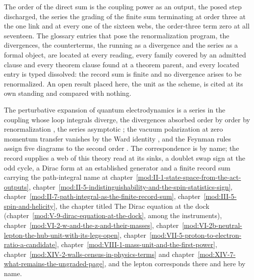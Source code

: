 The order of the direct sum is the coupling power as an output, the posed step discharged, the series the grading of the finite sum terminating at order three at the one link and at every one of the sixteen webs, the order-three term zero at all seventeen.
The glossary entries that pose the renormalization program, the divergences, the counterterms, the running as a divergence and the series as a formal object, are located at every reading, every family covered by an admitted clause and every theorem clause found at a theorem parent, and every located entry is typed dissolved: the record sum is finite and no divergence arises to be renormalized. An open result placed here, the unit as the scheme, is cited at its own standing and compared with nothing.
\begin{chbridge}
The perturbative expansion of quantum electrodynamics is a series in the coupling whose loop integrals diverge, the divergences absorbed order by order by renormalization \cite{Dyson1949}, the series asymptotic \cite{Dyson1952}; the vacuum polarization at zero momentum transfer vanishes by the Ward identity \cite{Peskin1995}, and the Feynman rules assign five diagrams to the second order \cite{Feynman1949}. The correspondence is by name; the record supplies a web of this theory read at its sinks, a doublet swap sign at the odd cycle, a Dirac form at an established generator and a finite record sum carrying the path-integral name at chapter~\ref{mod:II-1-state-space-from-the-act-outputs}, chapter~\ref{mod:II-5-indistinguishability-and-the-spin-statistics-sign}, chapter~\ref{mod:II-7-path-integral-as-the-finite-record-sum}, chapter~\ref{mod:III-5-spin-and-helicity}, the chapter titled The Dirac equation at the dock (chapter~\ref{mod:V-9-dirac-equation-at-the-dock}, among the instruments), chapter~\ref{mod:VI-2-w-and-the-z-and-their-masses}, chapter~\ref{mod:VI-2b-neutral-lepton-the-hub-unit-with-its-legs-open}, chapter~\ref{mod:VII-5-proton-to-electron-ratio-a-candidate}, chapter~\ref{mod:VIII-1-mass-unit-and-the-first-power}, chapter~\ref{mod:XIV-2-walls-census-in-physics-terms} and chapter~\ref{mod:XIV-7-what-remains-the-ungraded-page}, and the lepton corresponds there and here by name.
\end{chbridge}
